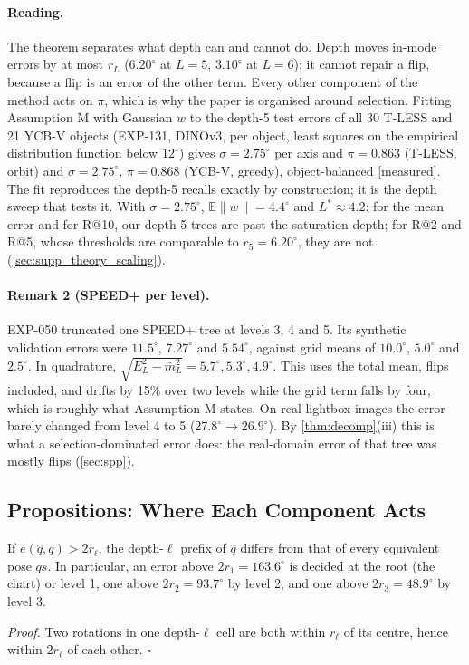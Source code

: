 \paragraph{Reading.}
The theorem separates what depth can and cannot do. Depth moves in-mode errors by at most $r_L$ ($6.20^\circ$ at $L=5$,
$3.10^\circ$ at $L=6$); it cannot repair a flip, because a flip is an error of the other term. Every other component of the
method acts on $\pi$, which is why the paper is organised around selection. Fitting Assumption M with Gaussian $w$ to the
depth-5 test errors of all 30 T-LESS and 21 YCB-V objects (EXP-131, DINOv3, per object, least squares on the empirical
distribution function below $12^\circ$) gives $\sigma=2.75^\circ$ per axis and $\pi=0.863$ (T-LESS, orbit) and
$\sigma=2.75^\circ$, $\pi=0.868$ (YCB-V, greedy), object-balanced [measured]. The fit reproduces the depth-5 recalls exactly
by construction; it is the depth sweep that tests it. With $\sigma=2.75^\circ$, $\mathbb E\|w\|=4.4^\circ$ and $L^\ast\approx4.2$: for
the mean error and for R@10, our depth-5 trees are past the saturation depth; for R@2 and R@5, whose thresholds are comparable to
$r_5=6.20^\circ$, they are not (\cref{sec:supp_theory_scaling}).

\paragraph{Remark 2 (SPEED+ per level).}
EXP-050 truncated one SPEED+ tree at levels 3, 4 and 5. Its synthetic validation errors were $11.5^\circ$, $7.27^\circ$ and
$5.54^\circ$, against grid means of $10.0^\circ$, $5.0^\circ$ and $2.5^\circ$. In quadrature,
$\sqrt{E_L^2-\bar m_L^2}=5.7^\circ,5.3^\circ,4.9^\circ$. This uses the total mean, flips included, and drifts by 15\% over two levels
while the grid term falls by four, which is roughly what Assumption M states.
On real lightbox images the error barely changed from level 4 to 5 ($27.8^\circ\to26.9^\circ$). By \cref{thm:decomp}(iii) this
is what a selection-dominated error does: the real-domain error of that tree was mostly flips (\cref{sec:spp}).

\subsection{Propositions: Where Each Component Acts}

\begin{proposition}\label{prop:toplevels}
If $e(\hat q,q)>2r_\ell$, the depth-$\ell$ prefix of $\hat q$ differs from that of every equivalent pose $qs$.
In particular, an error above $2r_1=163.6^\circ$ is decided at the root (the chart) or level 1, one above $2r_2=93.7^\circ$
by level 2, and one above $2r_3=48.9^\circ$ by level 3.
\end{proposition}
\noindent\emph{Proof.} Two rotations in one depth-$\ell$ cell are both within $r_\ell$ of its centre, hence within $2r_\ell$ of
each other. \hfill$\square$


